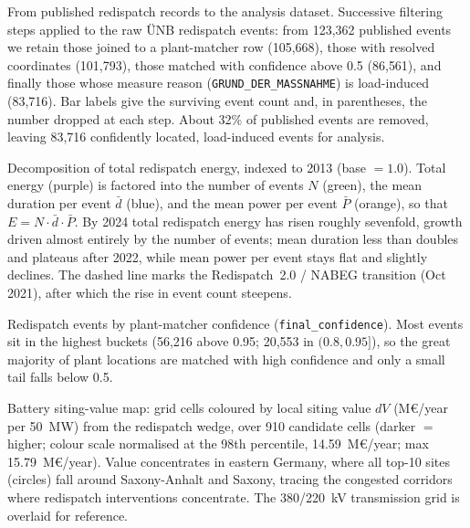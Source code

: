 
\caption{From published redispatch records to the analysis dataset.
Successive filtering steps applied to the raw \"UNB redispatch events: from
123{,}362 published events we retain those joined to a plant-matcher row
(105{,}668), those with resolved coordinates (101{,}793), those matched with
confidence above 0.5 (86{,}561), and finally those whose measure reason
(\texttt{GRUND\_DER\_MASSNAHME}) is load-induced (83{,}716). Bar labels give the
surviving event count and, in parentheses, the number dropped at each step.
About 32\% of published events are removed, leaving 83{,}716 confidently
located, load-induced events for analysis.}

\caption{Decomposition of total redispatch energy, indexed to 2013
(base $=1.0$). Total energy (purple) is factored into the number of events $N$
(green), the mean duration per event $\bar d$ (blue), and the mean power per
event $\bar P$ (orange), so that $E = N\cdot\bar d\cdot\bar P$. By 2024 total
redispatch energy has risen roughly sevenfold, growth driven almost entirely by
the number of events; mean duration less than doubles and plateaus after 2022,
while mean power per event stays flat and slightly declines. The dashed line
marks the Redispatch~2.0 / NABEG transition (Oct 2021), after which the rise in
event count steepens.}

\caption{Redispatch events by plant-matcher confidence
(\texttt{final\_confidence}). Most events sit in the highest buckets
(56{,}216 above 0.95; 20{,}553 in $(0.8,0.95]$), so the great majority of plant
locations are matched with high confidence and only a small tail falls below
0.5.}

\caption{Battery siting-value map: grid cells coloured by local siting value
$dV$ (M\euro/year per 50~MW) from the redispatch wedge, over 910 candidate
cells (darker $=$ higher; colour scale normalised at the 98th percentile,
14.59~M\euro/year; max 15.79~M\euro/year). Value concentrates in eastern
Germany, where all top-10 sites (circles) fall around Saxony-Anhalt and Saxony,
tracing the congested corridors where redispatch interventions concentrate. The
380/220~kV transmission grid is overlaid for reference.}

